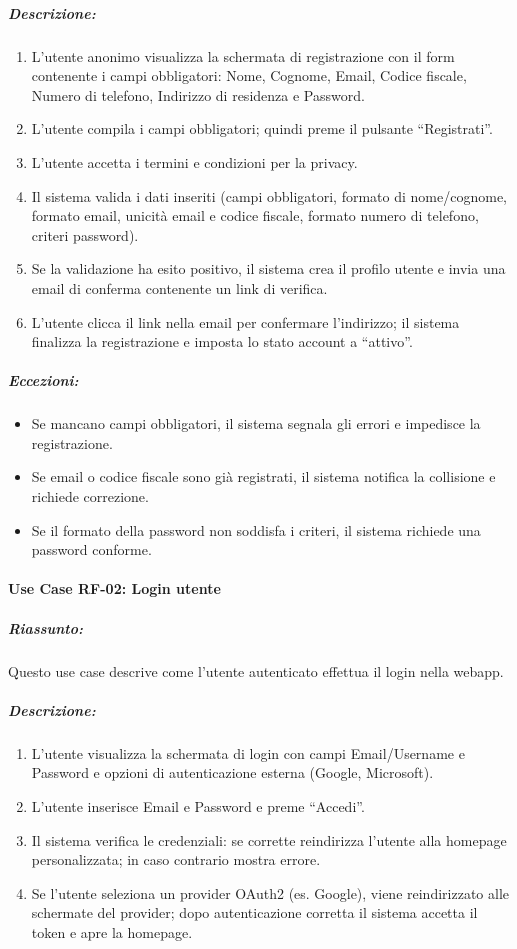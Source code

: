 \subparagraph*{Descrizione:}
\begin{enumerate}
    \item L’utente anonimo visualizza la schermata di registrazione con il form contenente i campi obbligatori: Nome, Cognome, Email, Codice fiscale, Numero di telefono, Indirizzo di residenza e Password.
    \item L’utente compila i campi obbligatori; quindi preme il pulsante ``Registrati''.
    \item L'utente accetta i termini e condizioni per la privacy.
    \item Il sistema valida i dati inseriti (campi obbligatori, formato di nome/cognome, formato email, unicità email e codice fiscale, formato numero di telefono, criteri password).
    \item Se la validazione ha esito positivo, il sistema crea il profilo utente e invia una email di conferma contenente un link di verifica.
    \item L’utente clicca il link nella email per confermare l’indirizzo; il sistema finalizza la registrazione e imposta lo stato account a ``attivo''.
\end{enumerate}

\subparagraph*{Eccezioni:}
\begin{itemize}
    \item Se mancano campi obbligatori, il sistema segnala gli errori e impedisce la registrazione.
    \item Se email o codice fiscale sono già registrati, il sistema notifica la collisione e richiede correzione.
    \item Se il formato della password non soddisfa i criteri, il sistema richiede una password conforme.
\end{itemize}

\paragraph*{Use Case RF-02: Login utente}
\subparagraph*{Riassunto:}
Questo use case descrive come l'utente autenticato effettua il login nella webapp.

\subparagraph*{Descrizione:}
\begin{enumerate}
    \item L’utente visualizza la schermata di login con campi Email/Username e Password e opzioni di autenticazione esterna (Google, Microsoft).
    \item L’utente inserisce Email e Password e preme ``Accedi''.
    \item Il sistema verifica le credenziali: se corrette reindirizza l’utente alla homepage personalizzata; in caso contrario mostra errore.
    \item Se l’utente seleziona un provider OAuth2 (es. Google), viene reindirizzato alle schermate del provider; dopo autenticazione corretta il sistema accetta il token e apre la homepage.
\end{enumerate}

